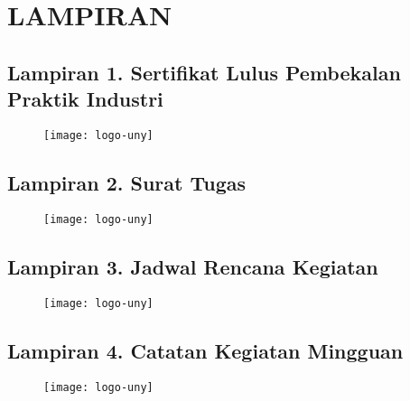 
\appendix
\chapter*{LAMPIRAN}


\section*{Lampiran 1. Sertifikat Lulus Pembekalan Praktik Industri}
\begin{figure}[H]
	\centering
	\texttt{[image: logo-uny]}
\end{figure}

\newpage

\section*{Lampiran 2. Surat Tugas \tipe}
\begin{figure}[H]
	\centering
	\texttt{[image: logo-uny]}
\end{figure}

\newpage

\section*{Lampiran 3. Jadwal Rencana Kegiatan \tipe}
\begin{figure}[H]
	\centering
	\texttt{[image: logo-uny]}
\end{figure}

\newpage

\section*{Lampiran 4. Catatan Kegiatan Mingguan}
\begin{figure}[H]
	\centering
	\texttt{[image: logo-uny]}
\end{figure}

